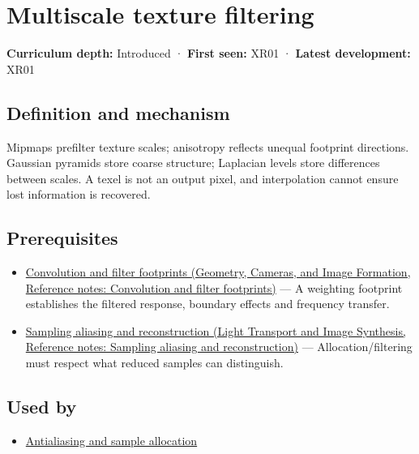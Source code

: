 \hypertarget{appendix-b677a85ba76f}{}\label{referencestart:appendix-b677a85ba76f}
\section{Multiscale texture filtering}\label{appendix-b677a85ba76f-multiscale-texture-filtering}

\textbf{Curriculum depth:} Introduced · \textbf{First seen:} XR01 · \textbf{Latest development:} XR01

\subsection{Definition and mechanism}\label{appendix-b677a85ba76f-definition-and-mechanism}

Mipmaps prefilter texture scales; anisotropy reflects unequal footprint directions. Gaussian pyramids store coarse structure; Laplacian levels store differences between scales. A texel is not an output pixel, and interpolation cannot ensure lost information is recovered.

\subsection{Prerequisites}\label{appendix-b677a85ba76f-prerequisites}

\begin{itemize}
\tightlist
\item
  \href{../03-Geometry-Cameras-and-Image-Formation/main.pdf\#nameddest=appendix-d5b3c692d9f0}{Convolution and filter footprints (Geometry, Cameras, and Image Formation, Reference notes: Convolution and filter footprints)} --- A weighting footprint establishes the filtered response, boundary effects and frequency transfer.
\item
  \href{../04-Light-Transport-and-Image-Synthesis/main.pdf\#nameddest=appendix-6a7869dd79a6}{Sampling aliasing and reconstruction (Light Transport and Image Synthesis, Reference notes: Sampling aliasing and reconstruction)} --- Allocation/filtering must respect what reduced samples can distinguish.
\end{itemize}

\subsection{Used by}\label{appendix-b677a85ba76f-used-by}

\begin{itemize}
\tightlist
\item
  \hyperref[appendix-4192b2bdd21e]{Antialiasing and sample allocation}
\end{itemize}

